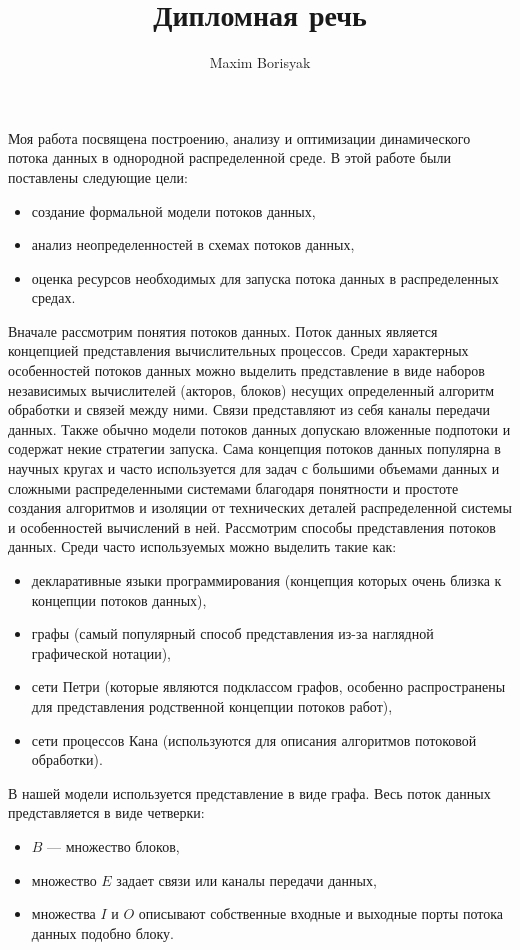 \documentclass[10pt,a4paper,onecolumn]{report}
\author{Maxim Borisyak}
\title{Дипломная речь}
\begin{document}
  Моя работа посвящена построению, анализу и оптимизации динамического потока данных в однородной распределенной среде.
  В этой работе были поставлены следующие цели:
  \begin{itemize}
    \item создание формальной модели потоков данных,
    \item анализ неопределенностей в схемах потоков данных,
    \item оценка ресурсов необходимых для запуска потока данных в распределенных средах.
  \end{itemize}
  
  Вначале рассмотрим понятия потоков данных.
  Поток данных является концепцией представления вычислительных процессов.
  Среди характерных особенностей потоков данных можно выделить представление в виде наборов независимых вычислителей (акторов, блоков)
  несущих определенный алгоритм обработки и связей между ними. Связи представляют из себя каналы передачи данных. Также обычно модели потоков данных
  допускаю вложенные подпотоки и содержат некие стратегии запуска.
  Сама концепция потоков данных популярна в научных кругах и часто используется для задач с большими объемами данных и сложными распределенными системами
  благодаря понятности и простоте создания алгоритмов и изоляции от технических деталей распределенной системы и особенностей вычислений в ней.
  Рассмотрим способы представления потоков данных. Среди часто используемых можно выделить такие как:
  \begin{itemize}
    \item декларативные языки программирования (концепция которых очень близка к концепции потоков данных),
    \item графы (самый популярный способ представления из-за наглядной графической нотации),
    \item сети Петри (которые являются подклассом графов, особенно распространены для представления родственной концепции потоков работ),
    \item сети процессов Кана (используются для описания алгоритмов потоковой обработки).
  \end{itemize}
  
  В нашей модели используется представление в виде графа. Весь поток данных представляется в виде четверки:
  \begin{itemize}
    \item $B$ --- множество блоков,
    \item множество $E$ задает связи или каналы передачи данных,
    \item множества $I$ и $O$ описывают собственные входные и выходные порты потока данных подобно блоку.
  \end{itemize}
  
\end{document}
